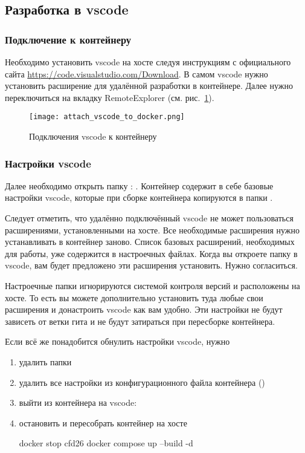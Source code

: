\subsection{Разработка в vscode}
\subsubsection{Подключение к контейнеру}
Необходимо установить vscode на хосте следуя инструкциям с официального сайта \url{https://code.visualstudio.com/Download}.
В самом vscode нужно установить расширение  для удалённой разработки в контейнере. 
Далее нужно переключиться на вкладку RemoteExplorer (см. рис.~\ref{fig:vscode_to_docker}).

\begin{figure}[h]
\centering
\texttt{[image: attach\_vscode\_to\_docker.png]}
\caption{Подключения vscode к контейнеру}
\label{fig:vscode_to_docker}
\end{figure}

\subsubsection{Настройки vscode}
Далее необходимо открыть папку : .
Контейнер содержит в себе базовые настройки vscode, которые при сборке контейнера
копируются в папки .

Следует отметить, что удалённо подключённый vscode не может пользоваться
расширениями, установленными на хосте. Все необходимые расширения нужно устанавливать в контейнер заново.
Список базовых расширений, необходимых для работы, уже содержится в настроечных файлах.
Когда вы откроете папку  в vscode, вам будет предложено эти расширения установить. Нужно согласиться.

Настроечные папки  игнорируются системой контроля версий и расположены на хосте.
То есть вы можете дополнительно установить туда любые свои расширения и донастроить vscode как вам удобно.
Эти настройки не будут зависеть от ветки гита и не будут затираться при пересборке контейнера.

Если всё же понадобится обнулить настройки vscode, нужно
\begin{enumerate}
\item удалить папки 
\item удалить все настройки из конфигурационного файла контейнера ()
\item выйти из контейнера на vscode: 
\item остановить и пересобрать контейнер на хосте
\begin{shelloutput}
docker stop cfd26
docker compose up --build -d
\end{shelloutput}
\end{enumerate}

